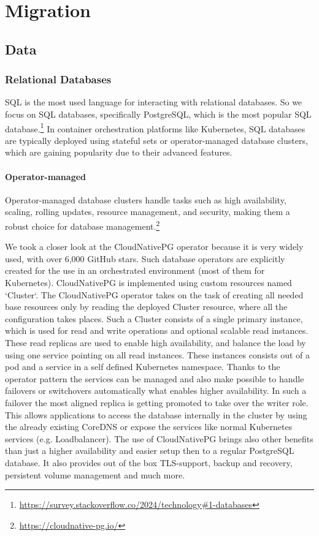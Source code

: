 %
\section{Migration}
\label{sec:migration}
%
\subsection{Data}
%
\subsubsection{Relational Databases}
%
SQL is the most used language for interacting with relational databases. So we focus on SQL databases, specifically PostgreSQL, which is the most popular SQL database.\footnote{\url{https://survey.stackoverflow.co/2024/technology#1-databases}} In container orchestration platforms like Kubernetes, SQL databases are typically deployed using stateful sets or operator-managed database clusters, which are gaining popularity due to their advanced features. 
%
\paragraph{Operator-managed}
%
Operator-managed database clusters handle tasks such as high availability, scaling, rolling updates, resource management, and security, making them a robust choice for database management.\footnote{\url{https://cloudnative-pg.io/}}

We took a closer look at the CloudNativePG operator  because it is very widely used, with over 6,000 GitHub stars.
Such database operators are explicitly created for the use in an orchestrated environment (most of them for Kubernetes).
CloudNativePG is implemented using custom resources named `Cluster`.
The CloudNativePG operator takes on the task of creating all needed base resources only by reading the deployed Cluster resource, where all the configuration takes places.
Such a Cluster consists of a single primary instance, which is used for read and write operations and optional scalable read instances.
These read replicas are used to enable high availability, and balance the load by using one service pointing on all read instances.
These instances consists out of a pod and a service in a self defined Kubernetes namespace.
Thanks to the operator pattern the services can be managed and also make possible to handle failovers or switchovers automatically what enables higher availability.
In such a failover the most aligned replica is getting promoted to take over the writer role.
This allows applications to access the database internally in the cluster by using the already existing CoreDNS or expose the services like normal Kubernetes services (e.g. Loadbalancer).
The use of CloudNativePG brings also other benefits than just a higher availability and easier setup then to a regular PostgreSQL database. It also provides out of the box TLS-support, backup and recovery, persistent volume management and much more.

